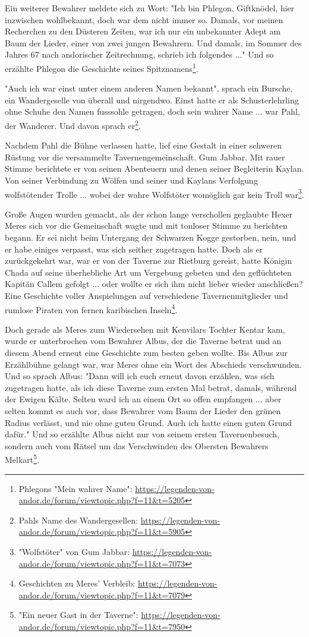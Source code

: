 Ein weiterer Bewahrer meldete sich zu Wort: "Ich bin Phlegon, Giftknödel, hier inzwischen wohlbekannt, doch war dem nicht immer so. Damals, vor meinen Recherchen zu den Düsteren Zeiten, war ich nur ein unbekannter Adept am Baum der Lieder, einer von zwei jungen Bewahrern. Und damals, im Sommer des Jahres 67 nach andorischer Zeitrechnung, schrieb ich folgendes ..." Und so erzählte Phlegon die Geschichte seines Spitznamens\footnote{Phlegons "Mein wahrer Name": \url{https://legenden-von-andor.de/forum/viewtopic.php?f=11&t=5205}}.

"Auch ich war einst unter einem anderen Namen bekannt", sprach ein Bursche, ein Wandergeselle von überall und nirgendwo. Einst hatte er als Schusterlehrling ohne Schuhe den Namen fusssohle getragen, doch sein wahrer Name ... war Pahl, der Wanderer. Und davon sprach er\footnote{Pahls Name des Wandergesellen: \url{https://legenden-von-andor.de/forum/viewtopic.php?f=11&t=5905}}.

Nachdem Pahl die Bühne verlassen hatte, lief eine Gestalt in einer schweren Rüstung vor die versammelte Tavernengemeinschaft. Gum Jabbar. Mit rauer Stimme berichtete er von seinen Abenteuern und denen seiner Begleiterin Kaylan. Von seiner Verbindung zu Wölfen und seiner und Kaylans Verfolgung wolfstötender Trolle ... wobei der wahre Wolfstöter womöglich gar kein Troll war\footnote{"Wolfstöter" von Gum Jabbar: \url{https://legenden-von-andor.de/forum/viewtopic.php?f=11&t=7073}}.

Große Augen wurden gemacht, als der schon lange verschollen geglaubte Hexer Meres sich vor die Gemeinschaft wagte und mit tonloser Stimme zu berichten begann. Er sei nicht beim Untergang der Schwarzen Kogge gestorben, nein, und er habe einiges verpasst, was sich seither zugetragen hatte. Doch als er zurückgekehrt war, war er von der Taverne zur Rietburg gereist, hatte Königin Chada auf seine überhebliche Art um Vergebung gebeten und den geflüchteten Kapitän Callem gefolgt ... oder wollte er sich ihm nicht lieber wieder anschließen? Eine Geschichte voller Anspielungen auf verschiedene Tavernenmitglieder und rumlose Piraten von fernen karibischen Inseln\footnote{Geschichten zu Meres' Verbleib: \url{https://legenden-von-andor.de/forum/viewtopic.php?f=11&t=7079}}.

Doch gerade als Meres zum Wiedersehen mit Kenvilars Tochter Kentar kam, wurde er unterbrochen vom Bewahrer Albus, der die Taverne betrat und an diesem Abend erneut eine Geschichte zum besten geben wollte. Bis Albus zur Erzählbühne gelangt war, war Meres ohne ein Wort des Abschieds verschwunden. Und so sprach Albus: "Dann will ich euch erneut davon erzählen, was sich zugetragen hatte, als ich diese Taverne zum ersten Mal betrat, damals, während der Ewigen Kälte. Selten ward ich an einem Ort so offen empfangen ... aber selten kommt es auch vor, dass Bewahrer vom Baum der Lieder den grünen Radius verlässt, und nie ohne guten Grund. Auch ich hatte einen guten Grund dafür." Und so erzählte Albus nicht nur von seinem ersten Tavernenbesuch, sondern auch vom Rätsel um das Verschwinden des Obersten Bewahrers Melkart\footnote{"Ein neuer Gast in der Taverne": \url{https://legenden-von-andor.de/forum/viewtopic.php?f=11&t=7950}}.

